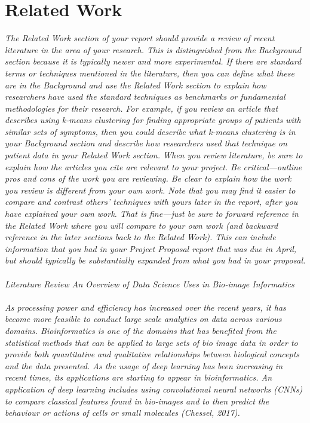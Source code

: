\section{Related Work}

\emph{The Related Work section of your report should provide a review of recent literature in the area of your research. This is distinguished from the Background section because it is typically newer and more experimental. If there are standard terms or techniques mentioned in the literature, then you can define what these are in the Background and use the Related Work section to explain how researchers have used the standard techniques as benchmarks or fundamental methodologies for their research. For example, if you review an article that describes using k-means clustering for finding appropriate groups of patients with similar sets of symptoms, then you could describe what k-means clustering is in your Background section and describe how researchers used that technique on patient data in your Related Work section. When you review literature, be sure to explain how the articles you cite are relevant to your project. Be critical---outline pros and cons of the work you are reviewing. Be clear to explain how the work you review is different from your own work. Note that you may find it easier to compare and contrast others' techniques with yours later in the report, after you have explained your own work. That is fine---just be sure to forward reference in the Related Work where you will compare to your own work (and backward reference in the later sections back to the Related Work). This can include information that you had in your Project Proposal report that was due in April, but should typically be substantially expanded from what you had in your proposal. \\ \\
Literature Review An Overview of Data Science Uses in Bio-image Informatics \\ \\
As processing power and efficiency has increased over the recent years, it has become more feasible to conduct large scale analytics on data across various domains. Bioinformatics is one of the domains that has benefited from the statistical methods that can be applied to large sets of bio image data in order to provide both quantitative and qualitative relationships between biological concepts and the data presented. As the usage of deep learning has been increasing in recent times, its applications are starting to appear in bioinformatics. An application of deep learning includes using convolutional neural networks (CNNs) to compare classical features found in bio-images and to then predict the behaviour or actions of cells or small molecules (Chessel, 2017). \\ \\
}
